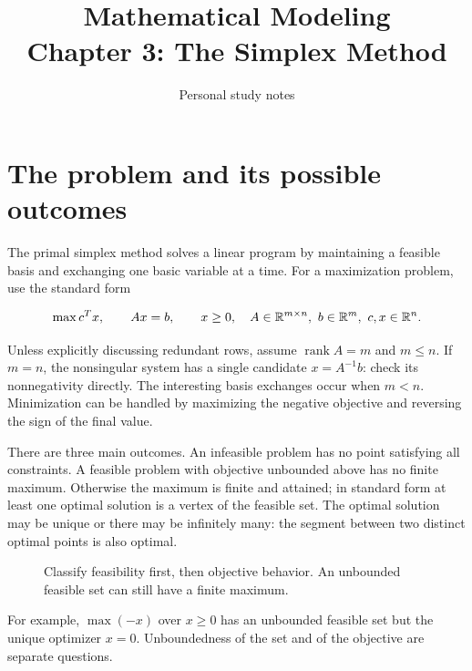 \documentclass[11pt,a4paper]{article}
\title{\textbf{Mathematical Modeling}\\[2mm]
\large Chapter 3: The Simplex Method}
\author{Personal study notes}
\date{}
\begin{document}
\maketitle
\lecturelegend
{\small\tableofcontents}

\section{The problem and its possible outcomes}\label{sec:problem}
The primal simplex method solves a linear program by maintaining a feasible
basis and exchanging one basic variable at a time. For a maximization problem,
use the standard form
\begin{lecturecore}
  \begin{equation}\label{eq:standard}
    \max c^Tx,\qquad Ax=b,\qquad x\geq0,
    \quad A\in\mathbb{R}^{m\times n},\ b\in\mathbb{R}^m,\ c,x\in\mathbb{R}^n.
  \end{equation}
\end{lecturecore}
Unless explicitly discussing redundant rows, assume $\operatorname{rank}A=m$
and $m\leq n$. If $m=n$, the nonsingular system has a single candidate
$x=A^{-1}b$: check its nonnegativity directly. The interesting basis exchanges
occur when $m<n$. Minimization can be handled by maximizing the negative
objective and reversing the sign of the final value.

There are three main outcomes. An infeasible problem has no point satisfying
all constraints. A feasible problem with objective unbounded above has no finite
maximum. Otherwise the maximum is finite and attained; in standard form at
least one optimal solution is a vertex of the feasible set. The optimal solution
may be unique or there may be infinitely many: the segment between two distinct
optimal points is also optimal.
\begin{figure}[H]
  \centering
  \caption{Classify feasibility first, then objective behavior. An unbounded
    feasible set can still have a finite maximum.}
  \label{fig:outcomes}
\end{figure}
For example, $\max(-x)$ over $x\geq0$ has an unbounded feasible set but the
unique optimizer $x=0$. Unboundedness of the set and of the objective are
separate questions.
\end{document}
